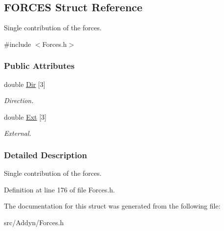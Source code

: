 \hypertarget{structFORCES}{\subsection{\-F\-O\-R\-C\-E\-S \-Struct \-Reference}
\label{structFORCES}
}


\-Single contribution of the forces.  




{\ttfamily \#include $<$\-Forces.\-h$>$}

\subsubsection*{\-Public \-Attributes}
\begin{DoxyCompactItemize}
\item 
\hypertarget{structFORCES_ac77c91979738079508cf3f257a7164ba}{double \hyperlink{structFORCES_ac77c91979738079508cf3f257a7164ba}{\-Dir} \mbox{[}3\mbox{]}}\label{structFORCES_ac77c91979738079508cf3f257a7164ba}

\begin{DoxyCompactList}\small\item\em \-Direction. \end{DoxyCompactList}\item 
\hypertarget{structFORCES_a034ef504c45f9a730ddb6053df710a38}{double \hyperlink{structFORCES_a034ef504c45f9a730ddb6053df710a38}{\-Ext} \mbox{[}3\mbox{]}}\label{structFORCES_a034ef504c45f9a730ddb6053df710a38}

\begin{DoxyCompactList}\small\item\em \-External. \end{DoxyCompactList}\end{DoxyCompactItemize}


\subsubsection{\-Detailed \-Description}
\-Single contribution of the forces. 

\-Definition at line 176 of file \-Forces.\-h.



\-The documentation for this struct was generated from the following file\-:\begin{DoxyCompactItemize}
\item 
src/\-Addyn/\-Forces.\-h\end{DoxyCompactItemize}
